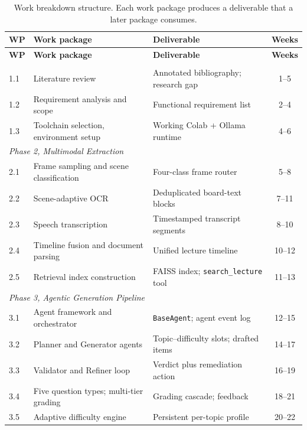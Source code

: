 {\footnotesize\singlespacing
\setlength{\tabcolsep}{4pt}
\begin{longtable}{|l|p{5.0cm}|p{5.6cm}|c|}
\caption{Work breakdown structure. Each work package produces a deliverable that a
later package consumes.}
\label{tab:wbs}\\
\hline
\textbf{WP} & \textbf{Work package} & \textbf{Deliverable} & \textbf{Weeks} \\
\hline
\endfirsthead
\hline
\textbf{WP} & \textbf{Work package} & \textbf{Deliverable} & \textbf{Weeks} \\
\hline
\endhead
\hline
\endfoot
\hline
\endlastfoot

\multicolumn{4}{|l|}{\emph{Phase 1, Planning and Research}} \\
\hline
1.1 & Literature review & Annotated bibliography; research gap & 1--5 \\
1.2 & Requirement analysis and scope & Functional requirement list & 2--4 \\
1.3 & Toolchain selection, environment setup & Working Colab + Ollama runtime & 4--6 \\
\hline
\multicolumn{4}{|l|}{\emph{Phase 2, Multimodal Extraction}} \\
\hline
2.1 & Frame sampling and scene classification & Four-class frame router & 5--8 \\
2.2 & Scene-adaptive OCR & Deduplicated board-text blocks & 7--11 \\
2.3 & Speech transcription & Timestamped transcript segments & 8--10 \\
2.4 & Timeline fusion and document parsing & Unified lecture timeline & 10--12 \\
2.5 & Retrieval index construction & FAISS index; \texttt{search\_lecture} tool & 11--13 \\
\hline
\multicolumn{4}{|l|}{\emph{Phase 3, Agentic Generation Pipeline}} \\
\hline
3.1 & Agent framework and orchestrator & \texttt{BaseAgent}; agent event log & 12--15 \\
3.2 & Planner and Generator agents & Topic--difficulty slots; drafted items & 14--17 \\
3.3 & Validator and Refiner loop & Verdict plus remediation action & 16--19 \\
3.4 & Five question types; multi-tier grading & Grading cascade; feedback & 18--21 \\
3.5 & Adaptive difficulty engine & Persistent per-topic profile & 20--22 \\
\hline

\end{longtable}}
